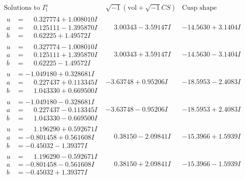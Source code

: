 \documentclass[1p]{elsarticle_modified}
\theoremstyle{definition}
\newcommand{\I}{\sqrt{-1}}
\begin{document}
$$\begin{array}{c|c|c}  
\text{Solutions to }I^u_{1}& \I (\text{vol} + \sqrt{-1}CS) & \text{Cusp shape}\\
 \hline 
\begin{aligned}
u &= \phantom{-}0.327774 + 1.008010 I \\
a &= \phantom{-}0.125111 - 1.395870 I \\
b &= \phantom{-}0.62225 + 1.49572 I\end{aligned}
 & \phantom{-}3.00343 - 3.59147 I & -14.5630 + 3.1404 I \\ \hline\begin{aligned}
u &= \phantom{-}0.327774 - 1.008010 I \\
a &= \phantom{-}0.125111 + 1.395870 I \\
b &= \phantom{-}0.62225 - 1.49572 I\end{aligned}
 & \phantom{-}3.00343 + 3.59147 I & -14.5630 - 3.1404 I \\ \hline\begin{aligned}
u &= -1.049180 + 0.328681 I \\
a &= \phantom{-}0.227437 + 0.113345 I \\
b &= \phantom{-}1.043330 + 0.669500 I\end{aligned}
 & -3.63748 + 0.95206 I & -18.5953 - 2.4083 I \\ \hline\begin{aligned}
u &= -1.049180 - 0.328681 I \\
a &= \phantom{-}0.227437 - 0.113345 I \\
b &= \phantom{-}1.043330 - 0.669500 I\end{aligned}
 & -3.63748 - 0.95206 I & -18.5953 + 2.4083 I \\ \hline\begin{aligned}
u &= \phantom{-}1.196290 + 0.592671 I \\
a &= -0.801458 + 0.561608 I \\
b &= -0.45032 - 1.39377 I\end{aligned}
 & \phantom{-}0.38150 - 2.09841 I & -15.3966 + 1.5939 I \\ \hline\begin{aligned}
u &= \phantom{-}1.196290 - 0.592671 I \\
a &= -0.801458 - 0.561608 I \\
b &= -0.45032 + 1.39377 I\end{aligned}
 & \phantom{-}0.38150 + 2.09841 I & -15.3966 - 1.5939 I \\ \hline\begin{aligned}

\end{aligned}
\end{array}$$
\end{document}
